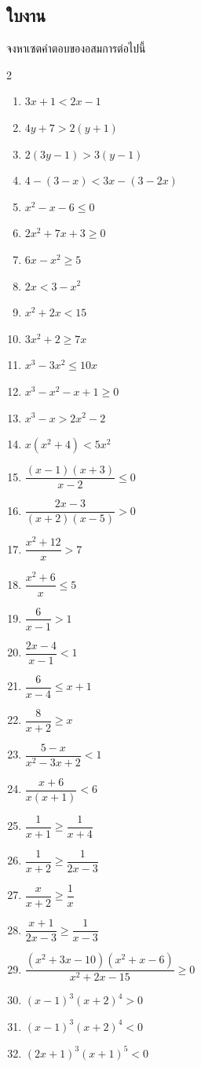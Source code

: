 \subsection*{ใบงาน}
จงหาเซตคำตอบของอสมการต่อไปนี้
\begin{multicols}{2}
	\begin{enumerate}[label=\arabic*., leftmargin=*]
		\item $3 x+1<2 x-1$
		\item $4 y+7>2(y+1)$
		\item $2(3 y-1)>3(y-1)$
		\item $4-(3-x)<3 x-(3-2 x)$
		\item $x^2-x-6 \leq 0$
		\item $2 x^2+7 x+3 \geq 0$
		\item $6 x-x^2 \geq 5$
		\item $2 x<3-x^2$
		\item $x^2+2 x<15$
		\item $3 x^2+2 \geq 7 x$
		\item $x^3-3 x^2 \leq 10 x$
		\item $x^3-x^2-x+1 \geq 0$
		\item $x^3-x>2 x^2-2$
		\item $x\left(x^2+4\right)<5 x^2$
		\item $\dfrac{(x-1)(x+3)}{x-2} \leq 0$
		\item $\dfrac{2 x-3}{(x+2)(x-5)}>0$
		\item $\dfrac{x^2+12}{x}>7$
		\item $\dfrac{x^2+6}{x} \leq 5$
		\item $\dfrac{6}{x-1}>1$
		\item $\dfrac{2 x-4}{x-1}<1$
		\item $\dfrac{6}{x-4} \leq x+1$
		\item $\dfrac{8}{x+2} \geq x$
		\item $\dfrac{5-x}{x^2-3 x+2}<1$
		\item $\dfrac{x+6}{x(x+1)}<6$
		\item $\dfrac{1}{x+1} \geq \dfrac{1}{x+4}$
		\item $\dfrac{1}{x+2} \geq \dfrac{1}{2 x-3}$
		\item $\dfrac{x}{x+2} \geq \dfrac{1}{x}$
		\item $\dfrac{x+1}{2 x-3} \geq \dfrac{1}{x-3}$
		\item $\dfrac{\left(x^2+3 x-10\right)\left(x^2+x-6\right)}{x^2+2 x-15} \geq 0$
		\item $(x-1)^3(x+2)^4>0$
		\item $(x-1)^3(x+2)^4<0$
		\item $(2 x+1)^3(x+1)^5<0$
	\end{enumerate}
\end{multicols}
\newpage
